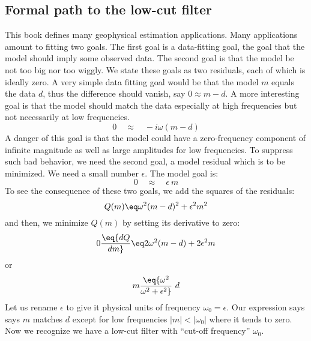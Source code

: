 \subsection{Formal path to the low-cut filter}

This book defines many geophysical estimation applications.
Many applications amount to fitting two goals.
The first goal is a data-fitting goal,
the goal that the model should imply some observed data.
The second goal is that the model be not too big nor too wiggly.
We state these goals as two residuals, each of which is ideally zero.
A very simple data fitting goal would be that
the model $m$ equals the data $d$,
thus the difference should vanish, say $0\approx  m- d$.
A more interesting goal is that the model should match the data
especially at high frequencies but not necessarily at low frequencies.
\begin{equation}
0 \quad\approx\quad  -i\omega(m - d)
\end{equation}
A danger of this goal is that the model could have a zero-frequency component
of infinite magnitude as well as large amplitudes for low frequencies.
To suppress such bad behavior, we need the second goal, a model residual
which is to be minimized.  We need a small number $\epsilon$.
The model goal is:
\begin{equation}
0 \quad\approx\quad \epsilon \ m
\end{equation}
To see the consequence of these two goals,
we add the squares of the residuals:
\begin{equation}
 Q(m) \eq \omega^2 (m-d)^2 + \epsilon^2  m^2
\end{equation}
and then, we minimize $Q(m)$ by setting its derivative to zero:
\begin{equation}
0\eq {dQ\over dm} \eq 2 \omega^2 (m-d) + 2\epsilon^2  m
\end{equation}
or
\begin{equation}
m \eq  {\omega^2 \over \omega^2+ \epsilon^2}\  d
\label{eqn:lowcut}
\end{equation}
Let us rename $\epsilon$ to give it physical units of frequency $\omega_0 = \epsilon$.
Our expression says
says $m$ matches $d$ except for low frequencies $|m| <|\omega_0|$ where it tends to zero.
Now we recognize we have a low-cut filter with 
``cut-off frequency''  $\omega_0$.


